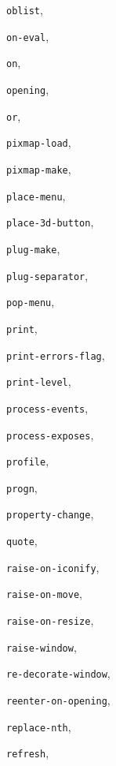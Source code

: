 \begin{theindex}
\item {\tt oblist}, {\bf\pageref{oblist}}
\item {\tt on-eval}, {\bf\pageref{on-eval}}
\item {\tt on}, {\bf\pageref{on}}
\item {\tt opening}, {\bf\pageref{opening}}
\item {\tt or}, {\bf\pageref{or}}
\item {\tt pixmap-load}, {\bf\pageref{pixmap-load}}
\item {\tt pixmap-make}, {\bf\pageref{pixmap-make}}
\item {\tt place-menu}, {\bf\pageref{place-menu}}
\item {\tt place-3d-button}, {\bf\pageref{place-3d-button}}
\item {\tt plug-make}, {\bf\pageref{plug-make}}
\item {\tt plug-separator}, {\bf\pageref{plug-separator}}
\item {\tt pop-menu}, {\bf\pageref{pop-menu}}
\item {\tt print}, {\bf\pageref{print}}
\item {\tt print-errors-flag}, {\bf\pageref{print-errors-flag}}
\item {\tt print-level}, {\bf\pageref{print-level}}
\item {\tt process-events}, {\bf\pageref{process-events}}
\item {\tt process-exposes}, {\bf\pageref{process-exposes}}
\item {\tt profile}, {\bf\pageref{standard-profile}}
\item {\tt progn}, {\bf\pageref{progn}}
\item {\tt property-change}, {\bf\pageref{property-change}}
\item {\tt quote}, {\bf\pageref{quote}}
\item {\tt raise-on-iconify}, {\bf\pageref{raise-on-move}}
\item {\tt raise-on-move}, {\bf\pageref{raise-on-move}}
\item {\tt raise-on-resize}, {\bf\pageref{raise-on-move}}
\item {\tt raise-window}, {\bf\pageref{raise-window}}
\item {\tt re-decorate-window}, {\bf\pageref{re-decorate-window}}
\item {\tt reenter-on-opening}, {\bf\pageref{reenter-on-opening}}
\item {\tt replace-nth}, {\bf\pageref{replace-nth}}
\item {\tt refresh}, {\bf\pageref{refresh}}

\end{theindex}
